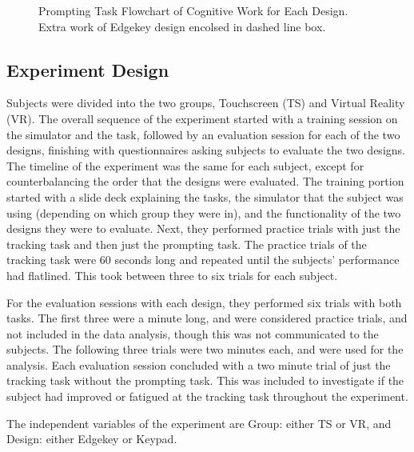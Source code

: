 \begin{figure}
    \medskip
    \caption{Prompting Task Flowchart of Cognitive Work for Each Design. Extra work of Edgekey design encolsed in dashed line box.}
    \label{fig:de_flowchart}
\end{figure}

\subsection{Experiment Design}

Subjects were divided into the two groups, Touchscreen (TS) and Virtual Reality (VR).
The overall sequence of the experiment started with a training session on the simulator and the task, followed by an evaluation session for each of the two designs, finishing with questionnaires asking subjects to evaluate the two designs.
The timeline of the experiment was the same for each subject, except for counterbalancing the order that the designs were evaluated.
The training portion started with a slide deck explaining the tasks, the simulator that the subject was using (depending on which group they were in), and the functionality of the two designs they were to evaluate.
Next, they performed practice trials with just the tracking task and then just the prompting task.
The practice trials of the tracking task were 60 seconds long and repeated until the subjects' performance had flatlined.
This took between three to six trials for each subject.

For the evaluation sessions with each design, they performed six trials with both tasks.
The first three were a minute long, and were considered practice trials, and not included in the data analysis, though this was not communicated to the subjects.
The following three trials were two minutes each, and were used for the analysis.
Each evaluation session concluded with a two minute trial of just the tracking task without the prompting task.
This was included to investigate if the subject had improved or fatigued at the tracking task throughout the experiment.

The independent variables of the experiment are Group: either TS or VR, and Design: either Edgekey or Keypad.

